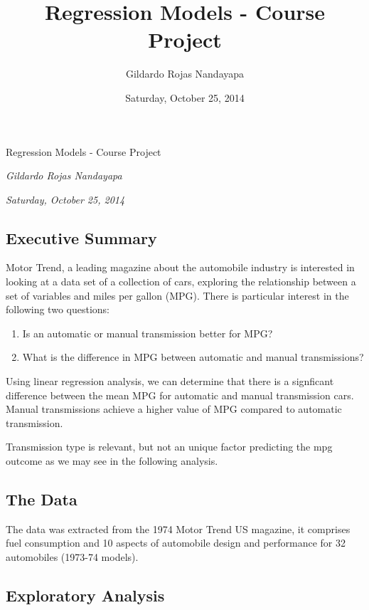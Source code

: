\documentclass[]{article}
\title{Regression Models - Course Project}
\author{Gildardo Rojas Nandayapa}
\date{Saturday, October 25, 2014}
\begin{document}
\begin{center}
\huge Regression Models - Course Project \\[0.2cm]
\end{center}
\begin{center}
\large \emph{Gildardo Rojas Nandayapa}\\[0.1cm]
\end{center}
\begin{center}
\large \emph{Saturday, October 25, 2014} \\
\end{center}
\normalsize


\subsection{Executive Summary}\label{executive-summary}

Motor Trend, a leading magazine about the automobile industry is
interested in looking at a data set of a collection of cars, exploring
the relationship between a set of variables and miles per gallon (MPG).
There is particular interest in the following two questions:

\begin{enumerate}
\def\labelenumi{\arabic{enumi}.}
\itemsep1pt\parskip0pt
\item
  Is an automatic or manual transmission better for MPG?
\item
  What is the difference in MPG between automatic and manual
  transmissions?
\end{enumerate}

Using linear regression analysis, we can determine that there is a
signficant difference between the mean MPG for automatic and manual
transmission cars. Manual transmissions achieve a higher value of MPG
compared to automatic transmission.

Transmission type is relevant, but not an unique factor predicting the
mpg outcome as we may see in the following analysis.

\subsection{The Data}\label{the-data}

The data was extracted from the 1974 Motor Trend US magazine, it
comprises fuel consumption and 10 aspects of automobile design and
performance for 32 automobiles (1973-74 models).

\subsection{Exploratory Analysis}\label{exploratory-analysis}
\end{document}
